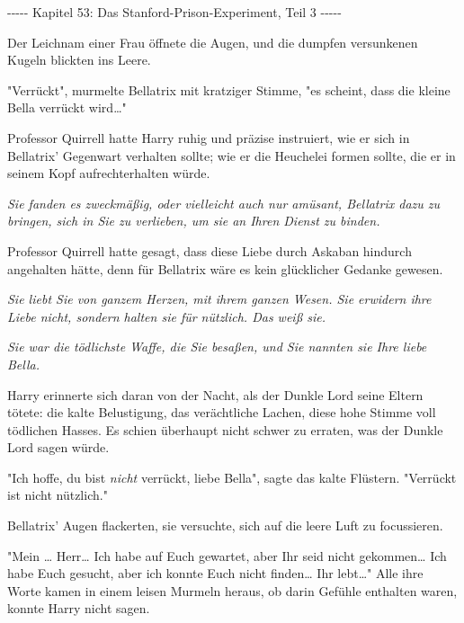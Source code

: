 

\hypertarget{das-stanford-prison-experiment-teil-3}{%

-\/-\/-\/-\/- Kapitel 53: Das Stanford-Prison-Experiment, Teil 3 -\/-\/-\/-\/-

Der Leichnam einer Frau öffnete die Augen, und die dumpfen versunkenen Kugeln blickten ins Leere.

"Verrückt", murmelte Bellatrix mit kratziger Stimme, "es scheint, dass die kleine Bella verrückt wird…"

Professor Quirrell hatte Harry ruhig und präzise instruiert, wie er sich in Bellatrix' Gegenwart verhalten sollte; wie er die Heuchelei formen sollte, die er in seinem Kopf aufrechterhalten würde.

\emph{Sie fanden es zweckmäßig, oder vielleicht auch nur amüsant, Bellatrix dazu zu bringen, sich in Sie zu verlieben, um sie an Ihren Dienst zu binden.}

Professor Quirrell hatte gesagt, dass diese Liebe durch Askaban hindurch angehalten hätte, denn für Bellatrix wäre es kein glücklicher Gedanke gewesen.

\emph{Sie liebt Sie von ganzem Herzen, mit ihrem ganzen Wesen. Sie erwidern ihre Liebe nicht, sondern halten sie für nützlich. Das weiß sie.}

\emph{Sie war die tödlichste Waffe, die Sie besaßen, und Sie nannten sie Ihre liebe Bella.}

Harry erinnerte sich daran von der Nacht, als der Dunkle Lord seine Eltern tötete: die kalte Belustigung, das verächtliche Lachen, diese hohe Stimme voll tödlichen Hasses. Es schien überhaupt nicht schwer zu erraten, was der Dunkle Lord sagen würde.

"Ich hoffe, du bist \emph{nicht} verrückt, liebe Bella", sagte das kalte Flüstern. "Verrückt ist nicht nützlich."

Bellatrix' Augen flackerten, sie versuchte, sich auf die leere Luft zu focussieren.

"Mein … Herr… Ich habe auf Euch gewartet, aber Ihr seid nicht gekommen… Ich habe Euch gesucht, aber ich konnte Euch nicht finden… Ihr lebt…" Alle ihre Worte kamen in einem leisen Murmeln heraus, ob darin Gefühle enthalten waren, konnte Harry nicht sagen.

}
